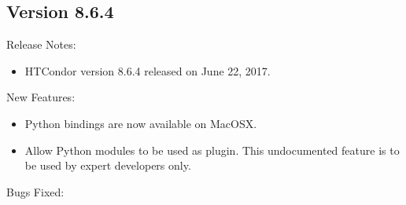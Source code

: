 \subsection*{\label{sec:New-8-6-4}Version 8.6.4}

\noindent Release Notes:

\begin{itemize}

\item HTCondor version 8.6.4 released on June 22, 2017.

\end{itemize}


\noindent New Features:

\begin{itemize}

\item Python bindings are now available on MacOSX.

\item Allow Python modules to be used as  plugin.
This undocumented feature is to be used by expert developers only.

\end{itemize}

\noindent Bugs Fixed:

